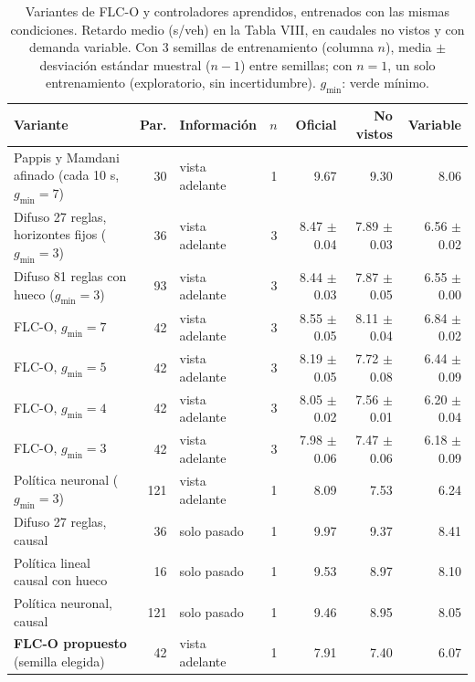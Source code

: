 \begin{table}[!t]
\centering
\caption{Variantes de FLC-O y controladores aprendidos, entrenados con las mismas condiciones. Retardo medio (s/veh) en la Tabla VIII, en caudales no vistos y con demanda variable. Con 3 semillas de entrenamiento (columna $n$), media $\pm$ desviaci\'on est\'andar muestral ($n-1$) entre semillas; con $n=1$, un solo entrenamiento (exploratorio, sin incertidumbre). $g_{\min}$: verde m\'inimo.}
\label{tab:ablacion}
\scriptsize
\setlength{\tabcolsep}{2.4pt}
\begin{tabular}{@{}lrlrrrr@{}}
\toprule
Variante & Par. & Informaci\'on & $n$ & Oficial & No vistos & Variable \\
\midrule
Pappis y Mamdani afinado (cada 10 s, $g_{\min}=7$) & 30 & vista adelante & 1 & 9.67 & 9.30 & 8.06 \\
Difuso 27 reglas, horizontes fijos ($g_{\min}=3$) & 36 & vista adelante & 3 & 8.47 $\pm$ 0.04 & 7.89 $\pm$ 0.03 & 6.56 $\pm$ 0.02 \\
Difuso 81 reglas con hueco ($g_{\min}=3$) & 93 & vista adelante & 3 & 8.44 $\pm$ 0.03 & 7.87 $\pm$ 0.05 & 6.55 $\pm$ 0.00 \\
FLC-O, $g_{\min}=7$ & 42 & vista adelante & 3 & 8.55 $\pm$ 0.05 & 8.11 $\pm$ 0.04 & 6.84 $\pm$ 0.02 \\
FLC-O, $g_{\min}=5$ & 42 & vista adelante & 3 & 8.19 $\pm$ 0.05 & 7.72 $\pm$ 0.08 & 6.44 $\pm$ 0.09 \\
FLC-O, $g_{\min}=4$ & 42 & vista adelante & 3 & 8.05 $\pm$ 0.02 & 7.56 $\pm$ 0.01 & 6.20 $\pm$ 0.04 \\
FLC-O, $g_{\min}=3$ & 42 & vista adelante & 3 & 7.98 $\pm$ 0.06 & 7.47 $\pm$ 0.06 & 6.18 $\pm$ 0.09 \\
Política neuronal ($g_{\min}=3$) & 121 & vista adelante & 1 & 8.09 & 7.53 & 6.24 \\
Difuso 27 reglas, causal & 36 & solo pasado & 1 & 9.97 & 9.37 & 8.41 \\
Política lineal causal con hueco & 16 & solo pasado & 1 & 9.53 & 8.97 & 8.10 \\
Política neuronal, causal & 121 & solo pasado & 1 & 9.46 & 8.95 & 8.05 \\
\textbf{FLC-O propuesto} (semilla elegida) & 42 & vista adelante & 1 & 7.91 & 7.40 & 6.07 \\
\bottomrule
\end{tabular}
\end{table}
